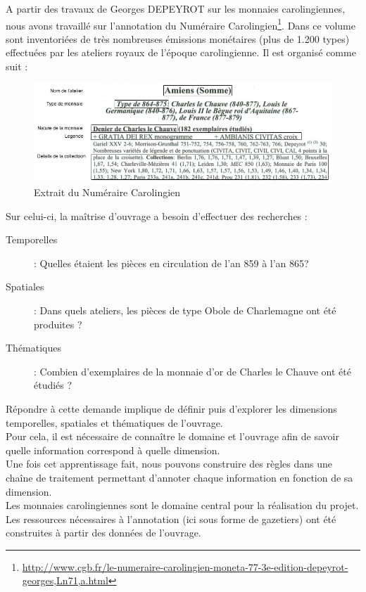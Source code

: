 \documentclass[a4paper, 11pt]{report}
\begin{document}
A partir des travaux de Georges DEPEYROT sur les monnaies carolingiennes, nous avons travaillé sur l'annotation du Numéraire Carolingien\footnote{\url{http://www.cgb.fr/le-numeraire-carolingien-moneta-77-3e-edition-depeyrot-georges,Ln71,a.html}}. Dans ce volume sont inventoriées de très nombreuses émissions monétaires (plus de 1.200 types) effectuées par les ateliers royaux de l'époque carolingienne. Il est organisé comme suit :
\begin{figure}[H]
\centering
\includegraphics[scale=.5]{img/depeyrotExemple.png}
\caption{Extrait du Numéraire Carolingien}
\end{figure}


Sur celui-ci, la maîtrise d'ouvrage a besoin d'effectuer des recherches :

\begin{description}
\item [Temporelles] : Quelles étaient les pièces en circulation de l'an 859 à l'an 865?
\item [Spatiales] : Dans quels ateliers, les pièces de type Obole de Charlemagne ont été produites ? 
\item [Thématiques] : Combien d'exemplaires de la monnaie d'or de Charles le Chauve ont été étudiés ?
\end{description}

Répondre à cette demande implique de définir puis d'explorer les dimensions temporelles, spatiales et thématiques de l'ouvrage.\\
Pour cela, il est nécessaire de connaître le domaine et l'ouvrage afin de savoir quelle information correspond à quelle dimension.\\
Une fois cet apprentissage fait, nous pouvons construire des règles dans une chaîne de traitement permettant d'annoter chaque information en fonction de sa dimension. \\

Les monnaies carolingiennes sont le domaine central pour la réalisation du projet. Les ressources nécessaires à l'annotation (ici sous forme de gazetiers) ont été construites à partir des données de l'ouvrage.\\
\end{document}
